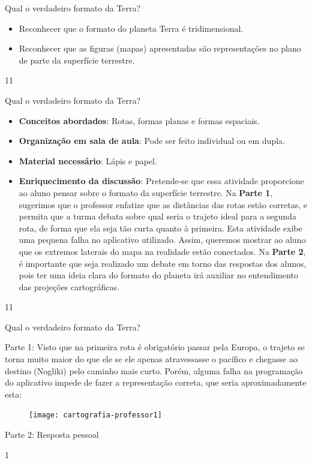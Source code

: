 \clearmargin
\begin{objectives}{Qual o verdadeiro formato da Terra?}
{
	\begin{itemize}
	\item Reconhecer que o formato do planeta Terra é  tridimensional.
	\item Reconhecer que as figuras (mapas) apresentadas são representações no plano de parte da superfície terrestre.

	\end{itemize}
}{1}{1}
\end{objectives}
\begin{sugestions}{Qual o verdadeiro formato da Terra?}
{
	\begin{itemize}
	\item \textbf{Conceitos abordados}: Rotas, formas planas e formas espaciais.
	\item  \textbf{Organização em sala de aula}: Pode ser feito individual ou em dupla.
	\item \textbf{Material necessário}: Lápis e papel.
	\item \textbf{Enriquecimento da discussão}: Pretende-se que essa atividade  proporcione ao aluno pensar sobre o formato da superfície terrestre. Na \textbf{Parte 1}, sugerimos que o professor enfatize que as distâncias das rotas estão corretas, e permita que a turma debata sobre qual seria o trajeto ideal para a segunda rota, de forma que ela seja tão curta quanto à primeira.	Esta atividade exibe uma pequena falha no aplicativo utilizado. Assim, queremos mostrar ao aluno que os extremos laterais do mapa na realidade estão conectados. Na \textbf{Parte 2}, é importante que seja realizado um debate em torno das respostas dos alunos, pois  ter uma ideia clara do formato do planeta irá auxiliar no entendimento das projeções cartográficas.
	
	\end{itemize}
	
	
	
}{1}{1}
\end{sugestions}
\begin{answer}{Qual o verdadeiro formato da Terra?}
{Parte 1: Visto que na primeira rota é obrigatório passar pela Europa, o trajeto se torna muito maior do que ele se ele apenas atravessasse o pacífico e chegasse ao destino (Nogliki) pelo caminho mais curto. Porém, alguma falha na programação do aplicativo impede de fazer a representação correta, que seria aproximadamente esta:
	\begin{figure}[H]
	\centering
	
	\texttt{[image: cartografia-professor1]}
	\end{figure}

	Parte 2: Resposta pessoal
}{1}
\end{answer}
